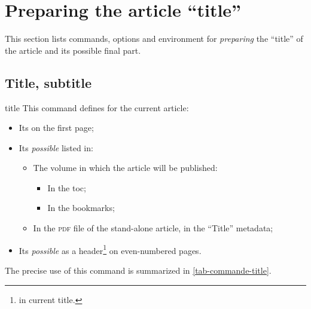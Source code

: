 \documentclass[english,nolocaltoc]{nwejmart}
\newtheorem[style=definition]{fact}
\newtheorem[title=experience]{experience}
\newtheorem[title-plural=rings]{ring}
\newtheorem[title=ideal,title-plural=ideals]{ideal}
\begin{document}
\section{Preparing the article  \enquote{title}}
\label{sec-prep-de-lart}

This section lists commands, options and environment for \emph{preparing} the \enquote{title} of the article and its possible final part.

\subsection{Title, subtitle}
\label{sec-title}

\begin{docCommand}[doc new=2017-10-23]{title}{}
  This command defines for the current article:
  \begin{itemize}
  \item Its  on the first page;
  \item Its \emph{possible}  listed in:
    \begin{itemize}
    \item The volume in which the article will be published:
      \begin{itemize}
      \item In the \gls{toc};
      \item In the bookmarks;
      \end{itemize}
    \item In the \textsc{pdf} file of the stand-alone article, in the \enquote{Title} metadata;
    \end{itemize}
  \item Its \emph{possible}  as a header\footnote{\Ie{} in current title.} on even-numbered pages.
  \end{itemize}
  The precise use of this command is summarized in \vref{tab-commande-title}.
\end{docCommand}
\end{document}
